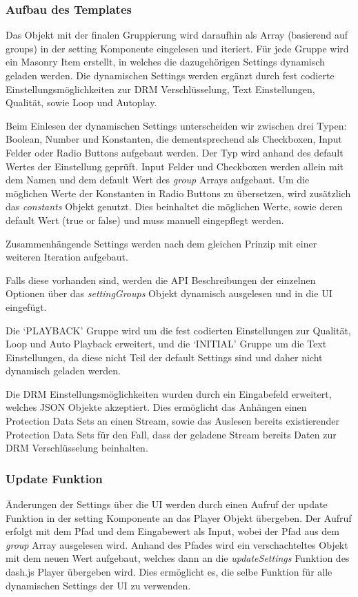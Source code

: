 \documentclass[conference]{IEEEtran}
\begin{document}
\subsubsection{Aufbau des Templates}
Das Objekt mit der finalen Gruppierung wird daraufhin als Array (basierend auf groups) in der setting Komponente eingelesen und iteriert. Für jede Gruppe wird ein Masonry Item erstellt, in welches die dazugehörigen Settings dynamisch geladen werden. Die dynamischen Settings werden ergänzt durch fest codierte Einstellungsmöglichkeiten zur DRM Verschlüsselung, Text Einstellungen, Qualität, sowie Loop und Autoplay.

Beim Einlesen der dynamischen Settings unterscheiden wir zwischen drei Typen: Boolean, Number und Konstanten, die dementsprechend als Checkboxen, Input Felder oder Radio Buttons aufgebaut werden.  Der Typ wird anhand des default Wertes der Einstellung geprüft. Input Felder und Checkboxen werden allein mit dem Namen und dem default Wert des \textit{group} Arrays aufgebaut. Um die möglichen Werte der Konstanten in Radio Buttons zu übersetzen, wird zusätzlich das \textit{constants} Objekt genutzt. Dies beinhaltet die möglichen Werte, sowie deren default Wert (true or false) und muss manuell eingepflegt werden. 

Zusammenhängende Settings werden nach dem gleichen Prinzip mit einer weiteren Iteration aufgebaut.

Falls diese vorhanden sind, werden die API Beschreibungen der einzelnen Optionen über das \textit{settingGroups} Objekt dynamisch ausgelesen und in die UI eingefügt.  

Die ‘PLAYBACK’ Gruppe wird um die fest codierten Einstellungen zur Qualität, Loop und Auto Playback erweitert, und die ‘INITIAL’ Gruppe um die Text Einstellungen, da diese nicht Teil der default Settings sind und daher nicht dynamisch geladen werden. 

Die DRM Einstellungsmöglichkeiten wurden durch ein Eingabefeld erweitert, welches JSON Objekte akzeptiert. Dies ermöglicht das Anhängen einen Protection Data Sets an einen Stream, sowie das Auslesen bereits existierender Protection Data Sets für den Fall, dass der geladene Stream bereits Daten zur DRM Verschlüsselung beinhalten.

\subsubsection{Update Funktion}
Änderungen der Settings über die UI werden durch einen Aufruf der update Funktion in der setting Komponente an das Player Objekt übergeben. Der Aufruf erfolgt mit dem Pfad und dem Eingabewert als Input,  wobei der Pfad aus dem \textit{group} Array ausgelesen wird. 
Anhand des Pfades wird ein verschachteltes Objekt mit dem neuen Wert aufgebaut, welches dann an die \textit{updateSettings} Funktion des dash.js Player übergeben wird. Dies ermöglicht es, die selbe Funktion für alle dynamischen Settings der UI zu verwenden.
\end{document}
